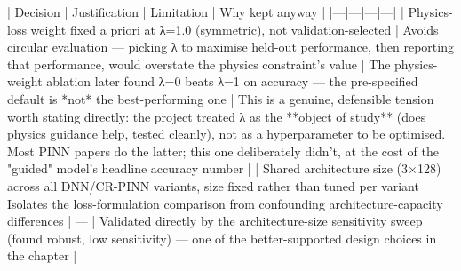 | Decision | Justification | Limitation | Why kept anyway |
|---|---|---|---|
| Physics-loss weight fixed a priori at λ=1.0 (symmetric), not validation-selected | Avoids circular evaluation — picking λ to maximise held-out performance, then reporting that performance, would overstate the physics constraint's value | The physics-weight ablation later found λ=0 beats λ=1 on accuracy — the pre-specified default is *not* the best-performing one | This is a genuine, defensible tension worth stating directly: the project treated λ as the **object of study** (does physics guidance help, tested cleanly), not as a hyperparameter to be optimised. Most PINN papers do the latter; this one deliberately didn't, at the cost of the "guided" model's headline accuracy number |
| Shared architecture size (3×128) across all DNN/CR-PINN variants, size fixed rather than tuned per variant | Isolates the loss-formulation comparison from confounding architecture-capacity differences | — | Validated directly by the architecture-size sensitivity sweep (found robust, low sensitivity) — one of the better-supported design choices in the chapter |
